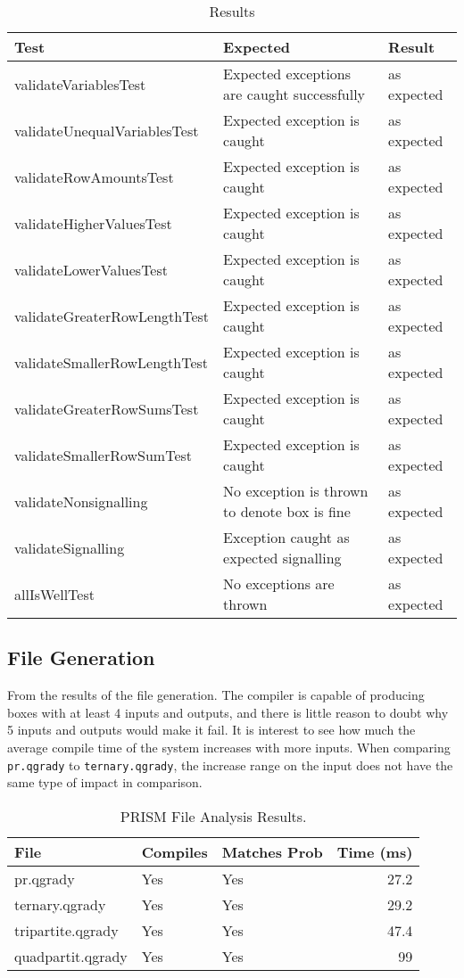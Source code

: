 \documentclass[report.tex]{subfiles}
\begin{document}
\begin{table}[H]
    \centering
    \begin{tabular}{l | p{6cm} | l}
    Test & Expected & Result \\    
    \hline
    validateVariablesTest & Expected exceptions are caught successfully 
    & as expected \\
    validateUnequalVariablesTest & Expected exception is caught 
    & as expected \\
    validateRowAmountsTest & Expected exception is caught & as expected \\
    validateHigherValuesTest & Expected exception is caught & as expected \\
    validateLowerValuesTest & Expected exception is caught & as expected \\
    validateGreaterRowLengthTest & Expected exception is caught & as expected \\
    validateSmallerRowLengthTest & Expected exception is caught & as expected \\
    validateGreaterRowSumsTest & Expected exception is caught & as expected \\
    validateSmallerRowSumTest & Expected exception is caught & as expected \\
    validateNonsignalling & No exception is thrown to denote box is fine & as expected \\
    validateSignalling & Exception caught as expected signalling & as expected \\
    allIsWellTest & No exceptions are thrown & as expected \\
    \end{tabular}
    \caption{Results}
  \label{tab:semantics_result}
\end{table}
\newpage
\subsection{File Generation} %
\label{sub:file_generation}
From the results of the file generation. The compiler is capable of producing
boxes with at least 4 inputs and outputs, and there is little reason to doubt
why 5 inputs and outputs would make it fail. It is interest to see how much the
average compile time of the system increases with more inputs. When comparing
\texttt{pr.qgrady} to \texttt{ternary.qgrady}, the increase range on the input
does not have the same type of impact in comparison.

\begin{table}[H]
  \centering
  \begin{tabular}{l | l | l | r}
    File & Compiles & Matches Prob & Time (ms)\\
    \hline
    pr.qgrady & Yes & Yes & 27.2 \\
    ternary.qgrady & Yes & Yes & 29.2 \\
    tripartite.qgrady & Yes & Yes & 47.4 \\
    quadpartit.qgrady & Yes & Yes & 99
  \end{tabular}
  \caption{PRISM File Analysis Results.}
  \label{tab:prism_result}
\end{table}
\end{document}
